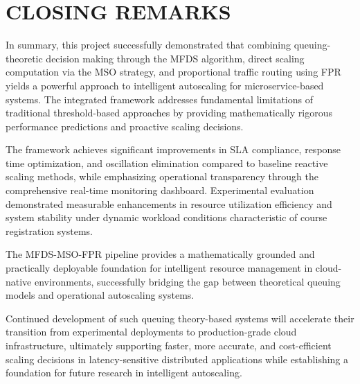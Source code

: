\section{\uppercase{Closing Remarks}}

In summary, this project successfully demonstrated that combining queuing-theoretic decision making through the MFDS algorithm, direct scaling computation via the MSO strategy, and proportional traffic routing using FPR yields a powerful approach to intelligent autoscaling for microservice-based systems. The integrated framework addresses fundamental limitations of traditional threshold-based approaches by providing mathematically rigorous performance predictions and proactive scaling decisions.

The framework achieves significant improvements in SLA compliance, response time optimization, and oscillation elimination compared to baseline reactive scaling methods, while emphasizing operational transparency through the comprehensive real-time monitoring dashboard. Experimental evaluation demonstrated measurable enhancements in resource utilization efficiency and system stability under dynamic workload conditions characteristic of course registration systems.

The MFDS-MSO-FPR pipeline provides a mathematically grounded and practically deployable foundation for intelligent resource management in cloud-native environments, successfully bridging the gap between theoretical queuing models and operational autoscaling systems.

Continued development of such queuing theory-based systems will accelerate their transition from experimental deployments to production-grade cloud infrastructure, ultimately supporting faster, more accurate, and cost-efficient scaling decisions in latency-sensitive distributed applications while establishing a foundation for future research in intelligent autoscaling.
